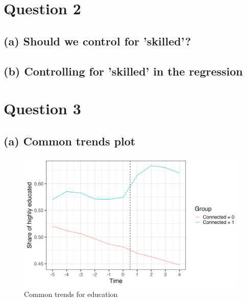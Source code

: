 \documentclass{scrartcl}
\begin{document}

\section*{Question 2}

\subsection*{(a) Should we control for 'skilled'?}


\subsection*{(b) Controlling for 'skilled' in the regression}




\section*{Question 3}

\subsection*{(a) Common trends plot}

\begin{figure}[h!]
    \centering
    \includegraphics[width=0.75\linewidth]{output/figures/2_common_trends.png}
    \caption{Common trends for education}
    \label{fig:commontrends}
\end{figure}
\end{document}
